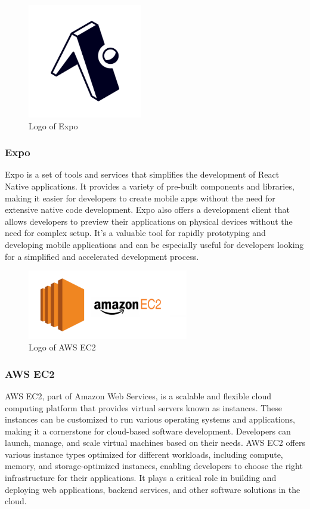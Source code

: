 \documentclass[conference]{IEEEtran}
\begin{document}
        \begin{figure}[htbp]
        \centerline{\includegraphics[width=5cm]{Images/logo/expo.png}}
        \label{fig}
        \caption{Logo of Expo}
        \end{figure}
        \subsubsection{Expo}
        Expo is a set of tools and services that simplifies the development of React Native applications. It provides a variety of pre-built components and libraries, making it easier for developers to create mobile apps without the need for extensive native code development. Expo also offers a development client that allows developers to preview their applications on physical devices without the need for complex setup. It's a valuable tool for rapidly prototyping and developing mobile applications and can be especially useful for developers looking for a simplified and accelerated development process.\\

        \begin{figure}[htbp]
        \centerline{\includegraphics[width=7cm]{Images/logo/aws.png}}
        \label{fig}
        \caption{Logo of AWS EC2}
        \end{figure}
        \subsubsection{AWS EC2}
        AWS EC2, part of Amazon Web Services, is a scalable and flexible cloud computing platform that provides virtual servers known as instances. These instances can be customized to run various operating systems and applications, making it a cornerstone for cloud-based software development. Developers can launch, manage, and scale virtual machines based on their needs. AWS EC2 offers various instance types optimized for different workloads, including compute, memory, and storage-optimized instances, enabling developers to choose the right infrastructure for their applications. It plays a critical role in building and deploying web applications, backend services, and other software solutions in the cloud.\\
        
\end{document}
